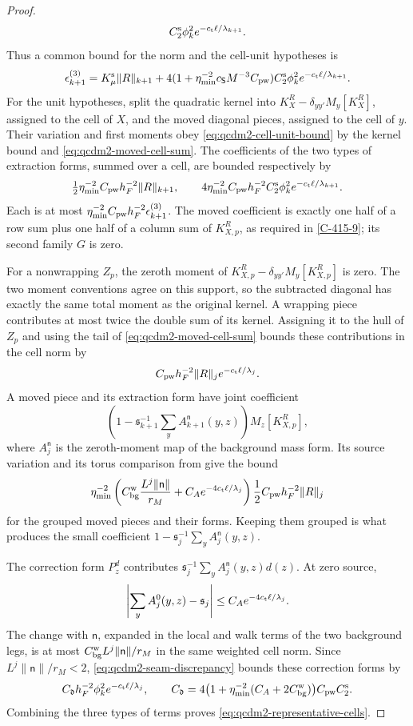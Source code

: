 \documentclass[11pt,letterpaper,reqno]{amsart}
\theoremstyle{definition}
\theoremstyle{remark}
\begin{document}
\begin{proof}
\[ C_2^{\rm s}\phi_k^2e^{-c_{\rm t}\ell/\lambda_{k+1}}.
\]
Thus a common bound for the norm and the cell-unit
hypotheses is
\begin{equation}\label{eq:qcdm2-extraction-size}
 \epsilon_{k+1}^{(3)}
 =K_\mu^{\rm s}\|R\|_{k+1}
 +4(1+\eta_{\min}^{-2}c_{\mathsf S}M^{-3}C_{\rm pw})
 C_2^{\rm s}\phi_k^2e^{-c_{\rm t}\ell/\lambda_{k+1}}.
\end{equation}
For the unit hypotheses, split the quadratic kernel into
$K^R_X-\delta_{yy'}M_y[K^R_X]$, assigned to the cell of
$X$, and the moved diagonal pieces, assigned to the cell
of $y$. Their variation and first moments obey
\eqref{eq:qcdm2-cell-unit-bound} by the kernel bound and
\eqref{eq:qcdm2-moved-cell-sum}.
The coefficients of the two types of extraction forms,
summed over a cell, are bounded respectively by
\[
 \tfrac12\eta_{\min}^{-2}C_{\rm pw}h_F^{-2}\|R\|_{k+1},
 \qquad
 4\eta_{\min}^{-2}C_{\rm pw}h_F^{-2}C_2^{\rm s}
 \phi_k^2e^{-c_{\rm t}\ell/\lambda_{k+1}}.
\]
Each is at most
$\eta_{\min}^{-2}C_{\rm pw}h_F^{-2}\epsilon_{k+1}^{(3)}$.
The moved coefficient is exactly one half of a row sum
plus one half of a column sum of $K^R_{X,p}$, as required
in \cref{C-415-9}; its second family $G$ is zero.

For a nonwrapping $Z_p$, the zeroth moment of
$K^R_{X,p}-\delta_{yy'}M_y[K^R_{X,p}]$ is zero. The
two moment conventions agree on this support, so the
subtracted diagonal has exactly the same total moment
as the original kernel.  A wrapping piece contributes
at most twice the double sum of its kernel.  Assigning
it to the hull of $Z_p$ and using the tail of
\eqref{eq:qcdm2-moved-cell-sum} bounds these contributions
in the cell norm by
\[
 C_{\rm pw}h_F^{-2}\|R\|_j
                      e^{-c_{\rm t}\ell/\lambda_j}.
\]
A moved piece and its extraction form have joint
coefficient
\[
 \left(1-\mathfrak s_{k+1}^{-1}
       \sum_yA_{k+1}^{\mathsf n}(y,z)\right)
 M_z[K^R_{X,p}],
\]
where $A_j^{\mathsf n}$ is the zeroth-moment map of the
background mass form.  Its source variation and its
torus comparison from \cite[proof of Prop. 10.1]{QCDM1}
give the bound
\[
 \eta_{\min}^{-2}
    \left(C_{\rm bg}^{\rm w}\frac{L^j\|\mathsf n\|}{r_M}
                 +C_Ae^{-4c_{\rm t}\ell/\lambda_j}\right)
       \frac12C_{\rm pw}h_F^{-2}\|R\|_j
\]
for the grouped moved pieces and their forms.  Keeping
them grouped is what produces the small coefficient
$1-\mathfrak s_j^{-1}\sum_yA_j^{\mathsf n}(y,z)$.

The correction form $P^d_z$ contributes
$\mathfrak s_j^{-1}\sum_yA_j^{\mathsf n}(y,z)d(z)$.
At zero source,
\[
 \left|\sum_yA_j^0(y,z)-\mathfrak s_j\right|
                    \le C_Ae^{-4c_{\rm t}\ell/\lambda_j}.
\]
The change with $\mathsf n$, expanded in the local and
walk terms of the two background legs, is at most
$C_{\rm bg}^{\rm w}L^j\|\mathsf n\|/r_M$ in the same
weighted cell norm.  Since $L^j\|\mathsf n\|/r_M<2$,
\eqref{eq:qcdm2-seam-discrepancy} bounds these correction
forms by
\[
 C_{\mathfrak d}h_F^{-2}\phi_k^2
                     e^{-c_{\rm t}\ell/\lambda_j},\qquad
 C_{\mathfrak d}
 =4\bigl(1+\eta_{\min}^{-2}(C_A+2C_{\rm bg}^{\rm w})\bigr)
                           C_{\rm pw}C_2^{\rm s}.
\]
Combining the three types of terms proves
\eqref{eq:qcdm2-representative-cells}.


\end{proof}
\end{document}
